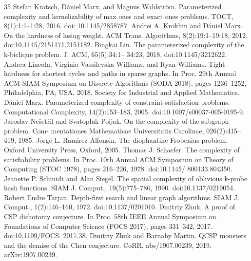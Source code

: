 \documentclass[10pt,a4paper]{article}
\theoremstyle{plain}
\begin{document}
\begin{thebibliography}{35}
Stefan Kratsch, Dániel Marx, and Magnus Wahlström. Parameterized complexity and kernelizability of max ones and exact ones problems. TOCT, 8(1):1:1–1:28, 2016. doi: 10.1145/2858787.
Andrei A. Krokhin and Dániel Marx. On the hardness of losing weight. ACM Trans. Algorithms, 8(2):19:1–19:18, 2012. doi:10.1145/2151171.2151182.
Bingkai Lin. The parameterized complexity of the k-biclique problem. J. ACM, 65(5):34:1– 34:23, 2018. doi:10.1145/3212622.
Andrea Lincoln, Virginia Vassilevska Williams, and Ryan Williams. Tight hardness for shortest cycles and paths in sparse graphs. In Proc. 29th Annual ACM-SIAM Symposium on Discrete Algorithms (SODA 2018), pages 1236–1252, Philadelphia, PA, USA, 2018. Society for Industrial and Applied Mathematics.
Dániel Marx. Parameterized complexity of constraint satisfaction problems. Computational Complexity, 14(2):153–183, 2005. doi:10.1007/s00037-005-0195-9.
Jaroslav Nešetřil and Svatopluk Poljak. On the complexity of the subgraph problem. Com- mentationes Mathematicae Universitatis Carolinae, 026(2):415–419, 1985.
Jorge L. Ramirez Alfonsin. The diophantine Frobenius problem. Oxford University Press, Oxford, 2005.
Thomas J. Schaefer. The complexity of satisfiability problems. In Proc. 10th Annual ACM Symposium on Theory of Computing (STOC 1978), pages 216–226, 1978. doi:10.1145/ 800133.804350.
Jeanette P. Schmidt and Alan Siegel. The spatial complexity of oblivious k-probe hash functions. SIAM J. Comput., 19(5):775–786, 1990. doi:10.1137/0219054.
Robert Endre Tarjan. Depth-first search and linear graph algorithms. SIAM J. Comput., 1(2):146–160, 1972. doi:10.1137/0201010.
Dmitriy Zhuk. A proof of CSP dichotomy conjecture. In Proc. 58th IEEE Annual Symposium on Foundations of Computer Science (FOCS 2017), pages 331–342, 2017. doi:10.1109/FOCS. 2017.38.
Dmitriy Zhuk and Barnaby Martin. QCSP monsters and the demise of the Chen conjecture. CoRR, abs/1907.00239, 2019. arXiv:1907.00239.
\end{thebibliography}
\end{document}
